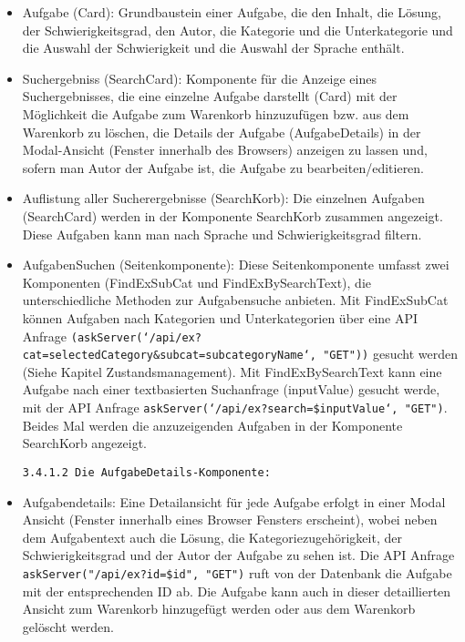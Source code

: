 \begin{itemize}

\item Aufgabe (Card):
Grundbaustein einer Aufgabe, die den Inhalt, die Lösung, der Schwierigkeitsgrad, den Autor, die Kategorie und die Unterkategorie und die Auswahl der Schwierigkeit und die Auswahl der Sprache enthält.

\item Suchergebniss (SearchCard):
Komponente für die Anzeige eines Suchergebnisses, die eine einzelne Aufgabe darstellt (Card) mit der Möglichkeit die Aufgabe zum Warenkorb hinzuzufügen bzw. aus dem Warenkorb zu löschen, die Details der Aufgabe (AufgabeDetails) in der Modal-Ansicht (Fenster innerhalb des Browsers) anzeigen zu lassen und, sofern man Autor der Aufgabe ist, die Aufgabe zu bearbeiten/editieren.

\item Auflistung aller Sucherergebnisse (SearchKorb):
Die einzelnen Aufgaben (SearchCard) werden in der Komponente SearchKorb zusammen angezeigt.
Diese Aufgaben kann man nach Sprache und Schwierigkeitsgrad filtern.

\item AufgabenSuchen (Seitenkomponente):
Diese Seitenkomponente umfasst zwei Komponenten (FindExSubCat und FindExBySearchText), die unterschiedliche Methoden zur Aufgabensuche anbieten. Mit FindExSubCat können Aufgaben nach Kategorien und Unterkategorien über eine API Anfrage \texttt{(askServer(`/api/ex?cat={selectedCategory}\&subcat={subcategoryName}`, "GET"))} gesucht werden (Siehe Kapitel Zustandsmanagement).
Mit FindExBySearchText kann eine Aufgabe nach einer textbasierten Suchanfrage (inputValue) gesucht werde, mit der API Anfrage \texttt{askServer(`/api/ex?search=\${inputValue}`, "GET")}.
Beides Mal werden die anzuzeigenden Aufgaben in der Komponente SearchKorb angezeigt.


\texttt{3.4.1.2 Die AufgabeDetails-Komponente:}

\item Aufgabendetails:
Eine Detailansicht für jede Aufgabe erfolgt in einer Modal Ansicht (Fenster innerhalb eines Browser Fensters erscheint), wobei neben dem Aufgabentext auch die Lösung, die Kategoriezugehörigkeit, der Schwierigkeitsgrad und der Autor der Aufgabe zu sehen ist. 
Die API Anfrage \texttt{askServer("/api/ex?id=\${id}", "GET")} ruft von der Datenbank die Aufgabe mit der entsprechenden ID ab.
Die Aufgabe kann auch in dieser detaillierten Ansicht zum Warenkorb hinzugefügt werden oder aus dem Warenkorb gelöscht werden.


\end{itemize}
